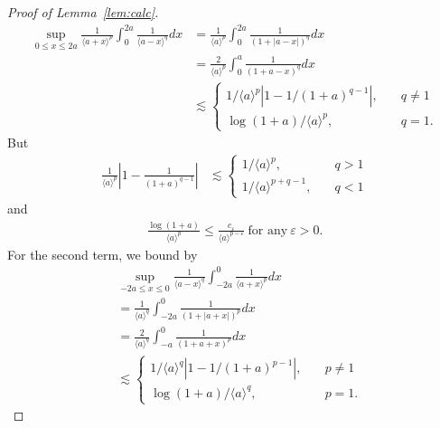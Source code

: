 \documentclass[12pt,reqno]{amsart}
\numberwithin{equation}{section}  %
\numberwithin{figure}{section}
\newcommand{\ee}{\varepsilon}
\begin{document}
\begin{proof}[Proof of Lemma~\ref{lem:calc}]
\begin{equation*}
\begin{split}
\sup_{0 \le x \le 2a} \frac{1}{\langle a + x \rangle
^{p}} \int_{0}^{2a} \frac{1}{\langle a - x \rangle ^{q}} d x
& = \frac{1}{\langle a \rangle ^{p}} \int_{0}^{2a} \frac{1}{(1 + | a -
x
|)^{q}} d x  
\\
& = \frac{2}{\langle a \rangle ^{p}} \int_{0}^{a} \frac{1}{(1 + a -
x)^{q}} d x
\\
& \lesssim
\begin{cases}
1/{\langle a \rangle ^{p}} \left| 1 - 1/{(1 +
a)^{q -1}} \right|, \quad & q \neq 1
\\
\log(1+a)/{\langle a \rangle^{p} }, \quad & q =1.
\end{cases}
\end{split}
\end{equation*}
%
But
%
%
\begin{equation*}
\begin{split}
\frac{1}{\langle a \rangle ^{p}}\left| 1 - \frac{1}{(1 +
a)^{q -1}} \right|
& \lesssim
\begin{cases}
1/{\langle a \rangle^{p} }, \quad & q > 1
\\
1/{\langle a \rangle ^{p + q -1}}, \quad & q < 1
\end{cases}
\end{split}
\end{equation*}
%
%
and
%
%
\begin{equation*}
\begin{split}
\frac{\log(1 + a)}{\langle a \rangle^{p} } \le  \frac{c_{\ee}}{\langle a
\rangle ^{p - \ee}} \ \text{for any} \ \ee > 0.
\end{split}
\end{equation*}
%
For the second term, we bound by
%
%
\begin{equation*}
\begin{split}
& \sup_{-2a \le x \le 0} \frac{1}{\langle a - x \rangle
^{q}} \int_{-2a}^{0} \frac{1}{\langle a + x \rangle ^{p}} d x
\\
& = \frac{1}{\langle a \rangle ^{q}} \int_{-2a}^{0} \frac{1}{(1 + | a +
x
|)^{p}} d x 
\\
& = \frac{2}{\langle a \rangle ^{q}} \int_{-a}^{0} \frac{1}{(1 + a +
x)^{p}} d x
\\
& \lesssim
\begin{cases}
1/{\langle a \rangle ^{q}} \left| 1 - 1/{(1 +
a)^{p -1}} \right|, \quad & p \neq 1
\\
\log(1+a)/{\langle a \rangle^{q} }, \quad & p =1.
\end{cases}
\end{split}
\end{equation*}

\end{proof}
\end{document}
